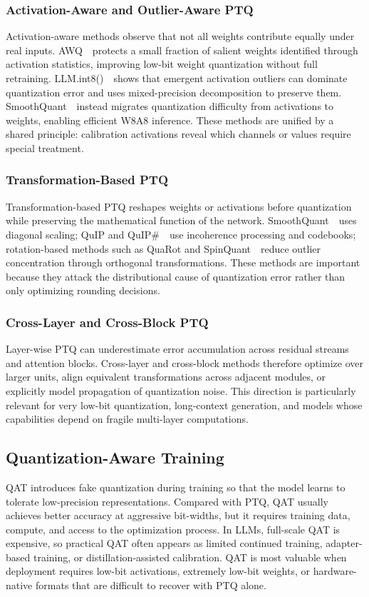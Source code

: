 \documentclass[journal,10pt]{IEEEtran}
\begin{document}
\subsubsection{Activation-Aware and Outlier-Aware PTQ}
Activation-aware methods observe that not all weights contribute equally under real inputs. AWQ~\cite{lin2023awq}\ protects a small fraction of salient weights identified through activation statistics, improving low-bit weight quantization without full retraining. LLM.int8()~\cite{dettmers2022llmint8}\ shows that emergent activation outliers can dominate quantization error and uses mixed-precision decomposition to preserve them. SmoothQuant~\cite{xiao2022smoothquant}\ instead migrates quantization difficulty from activations to weights, enabling efficient W8A8 inference. These methods are unified by a shared principle: calibration activations reveal which channels or values require special treatment.

\subsubsection{Transformation-Based PTQ}
Transformation-based PTQ reshapes weights or activations before quantization while preserving the mathematical function of the network. SmoothQuant~\cite{xiao2022smoothquant}\ uses diagonal scaling; QuIP and QuIP\#~\cite{chee2023quip,tsai2024quipsharp}\ use incoherence processing and codebooks; rotation-based methods such as QuaRot and SpinQuant~\cite{liu2024spinquant}\ reduce outlier concentration through orthogonal transformations. These methods are important because they attack the distributional cause of quantization error rather than only optimizing rounding decisions.

\subsubsection{Cross-Layer and Cross-Block PTQ}
Layer-wise PTQ can underestimate error accumulation across residual streams and attention blocks. Cross-layer and cross-block methods therefore optimize over larger units, align equivalent transformations across adjacent modules, or explicitly model propagation of quantization noise. This direction is particularly relevant for very low-bit quantization, long-context generation, and models whose capabilities depend on fragile multi-layer computations.

\subsection{Quantization-Aware Training}
QAT introduces fake quantization during training so that the model learns to tolerate low-precision representations. Compared with PTQ, QAT usually achieves better accuracy at aggressive bit-widths, but it requires training data, compute, and access to the optimization process. In LLMs, full-scale QAT is expensive, so practical QAT often appears as limited continued training, adapter-based training, or distillation-assisted calibration. QAT is most valuable when deployment requires low-bit activations, extremely low-bit weights, or hardware-native formats that are difficult to recover with PTQ alone.
\end{document}
